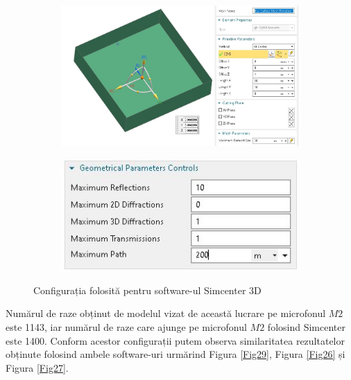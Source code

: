 	\begin{figure}[!htb]%
		\begin{subfigure}[b]{.6\textwidth}
			\centering
			\includegraphics[width=1\linewidth]{imagini/room_primitive.jpg} 
		\end{subfigure}
		\hfill
		\begin{subfigure}[b]{.3\textwidth}
			\centering
			\includegraphics[width=1\linewidth]{imagini/solver_params.jpg}
		\end{subfigure}
		
		\caption{Configurația folosită pentru software-ul Simcenter 3D}
		\label{config}	
	\end{figure}
	
	Numărul de raze obținut de modelul vizat de această lucrare pe microfonul $M2$ este 1143, iar numărul de raze care ajunge pe microfonul $M2$ folosind Simcenter este 1400. Conform acestor configurații putem observa similaritatea rezultatelor obținute folosind ambele software-uri urmărind Figura \ref{Fig29}, Figura \ref{Fig26} și Figura \ref{Fig27}.
	
